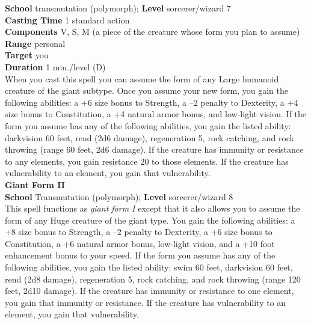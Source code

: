 \textbf{School }transmutation (polymorph); \textbf{Level }sorcerer/wizard 7\\
\textbf{Casting Time }1 standard action\\
\textbf{Components }V, S, M (a piece of the creature whose form you plan to assume)\\
\textbf{Range }personal\\
\textbf{Target }you\\
\textbf{Duration }1 min./level (D)\\
When you cast this spell you can assume the form of any Large humanoid creature of the giant subtype. Once you assume your new form, you gain the following abilities: a +6 size bonus to Strength, a –2 penalty to Dexterity, a +4 size bonus to Constitution, a +4 natural armor bonus, and low-light vision. If the form you assume has any of the following abilities, you gain the listed ability: darkvision 60 feet, rend (2d6 damage), regeneration 5, rock catching, and rock throwing (range 60 feet, 2d6 damage). If the creature has immunity or resistance to any elements, you gain resistance 20 to those elements. If the creature has vulnerability to an element, you gain that vulnerability.\\
\textbf{Giant Form II}\\
\textbf{School }Transmutation (polymorph); \textbf{Level }sorcerer/wizard 8\\
This spell functions as \textit{giant form I }except that it also allows you to assume the form of any Huge creature of the giant type. You gain the following abilities: a +8 size bonus to Strength, a –2 penalty to Dexterity, a +6 size bonus to Constitution, a +6 natural armor bonus, low-light vision, and a +10 foot enhancement bonus to your speed. If the form you assume has any of the following abilities, you gain the listed ability: swim 60 feet, darkvision 60 feet, rend (2d8 damage), regeneration 5, rock catching, and rock throwing (range 120 feet, 2d10 damage). If the creature has immunity or resistance to one element, you gain that immunity or resistance. If the creature has vulnerability to an element, you gain that vulnerability.\\
